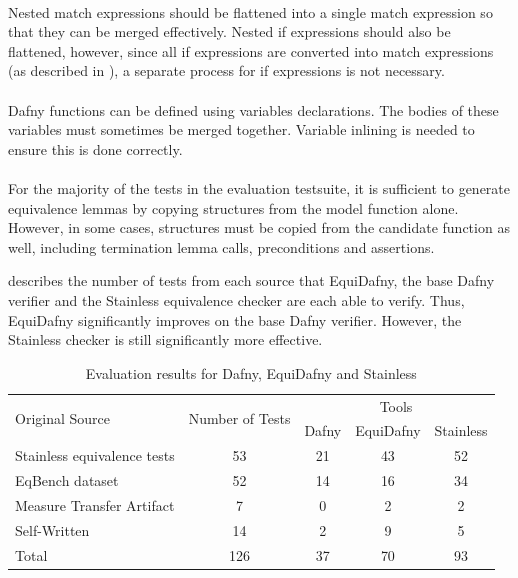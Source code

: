 \paragraph{} Nested match expressions should be flattened into a single match expression so that they can be merged effectively. Nested if expressions should also be flattened, however, since all if expressions are converted into match expressions (as described in ), a separate process for if expressions is not necessary.

\paragraph{} Dafny functions can be defined using variables declarations. The bodies of these variables must sometimes be merged together. Variable inlining is needed to ensure this is done correctly. 

\paragraph{} For the majority of the tests in the evaluation testsuite, it is sufficient to generate equivalence lemmas by copying structures from the model function alone. However, in some cases, structures must be copied from the candidate function as well, including termination lemma calls, preconditions and assertions.

 describes the number of tests from each source that EquiDafny, the base Dafny verifier and the Stainless equivalence checker are each able to verify. Thus, EquiDafny significantly improves on the base Dafny verifier. However, the Stainless checker is still significantly more effective.

\begin{table}[ht]
  \centering
  \begin{tabular}{lcccc}
    \toprule
    \multirow{2}{*}{Original Source} & \multirow{2}{*}{Number of Tests} & \multicolumn{3}{c}{Tools} \\
    & & Dafny & EquiDafny & Stainless \\
    \midrule
    Stainless equivalence tests & 53 & 21 & 43 & 52 \\
    EqBench dataset & 52 & 14 & 16 & 34 \\
    Measure Transfer Artifact & 7 & 0 & 2 & 2 \\
    Self-Written & 14 & 2 & 9 & 5 \\
    Total & 126 & 37 & 70 & 93 \\
    \bottomrule
  \end{tabular}
  \caption{Evaluation results for Dafny, EquiDafny and Stainless}
  \label{tbl:evaluation-results}
\end{table}

